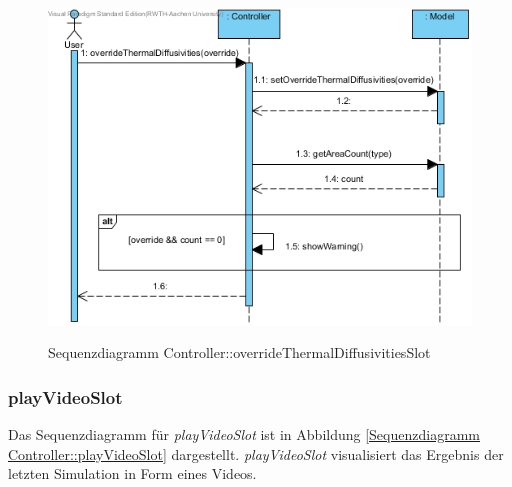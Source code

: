 \begin{figure}[H]
	\centering
	\includegraphics[scale=.6]{Bilder/Controller__overrideThermalDiffusivitiesSlot().jpg}\\
	\caption{Sequenzdiagramm Controller::overrideThermalDiffusivitiesSlot}
	\label{Sequenzdiagramm Controller::overrideThermalDiffusivitiesSlot}
\end{figure}

\subsubsection*{playVideoSlot}

Das Sequenzdiagramm für \emph{playVideoSlot} ist in Abbildung \ref{Sequenzdiagramm Controller::playVideoSlot} dargestellt. \emph{playVideoSlot} visualisiert das Ergebnis der letzten Simulation in Form eines Videos.

